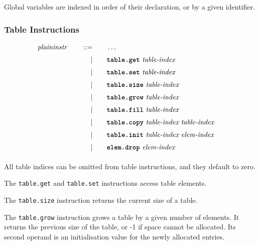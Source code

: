 Global variables are indexed in order of their declaration, or by a given identifier. \vspace{1em}

\subsubsection{Table Instructions}
\begin{alignat*}{9}
    && \textit{plaininstr}\ &&\quad ::= &\quad && \dots \quad &&  \\[1mm]
    &&       &&\quad | &\quad && \textbf{\texttt{table.get}}\ \textit{table-index}\ \quad &&  \\[1mm]
    &&       &&\quad | &\quad && \textbf{\texttt{table.set}}\ \textit{table-index}\ \quad &&  \\[1mm]
    &&       &&\quad | &\quad && \textbf{\texttt{table.size}}\ \textit{table-index}\ \quad &&  \\[1mm]
    &&       &&\quad | &\quad && \textbf{\texttt{table.grow}}\ \textit{table-index}\ \quad &&  \\[1mm]
    &&       &&\quad | &\quad && \textbf{\texttt{table.fill}}\ \textit{table-index}\ \quad &&  \\[1mm]
    &&       &&\quad | &\quad && \textbf{\texttt{table.copy}}\ \textit{table-index}\ \textit{table-index}\ \quad &&  \\[1mm]
    &&       &&\quad | &\quad && \textbf{\texttt{table.init}}\ \textit{table-index}\ \textit{elem-index}\ \quad &&  \\[1mm]
    &&       &&\quad | &\quad && \textbf{\texttt{elem.drop}}\ \textit{elem-index}\ \quad &&  \\[1mm]
\end{alignat*}

All table indices can be omitted from table instructions, and they default to zero.



The \texttt{table.get} and \texttt{table.set} instructions access table elements. \vspace{1em}

The \texttt{table.size} instruction returns the current size of a table. \vspace{1em}

The \texttt{table.grow} instruction grows a table by a given number of elements. It returns the previous size of the table, or -1 if space cannot be allocated. Its second operand is an initialisation value for the newly allocated entries. \vspace{1em}

